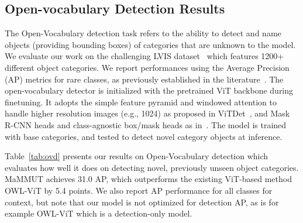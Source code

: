 \documentclass[10pt]{article} \usepackage[accepted]{tmlr}
\newcommand{\ours}{MaMMUT\xspace}
\begin{document}
\subsection{Open-vocabulary Detection Results}
\label{sec:detection}

The Open-Vocabulary detection task refers to the ability to detect and name objects (providing bounding boxes) of categories that are unknown to the model. We evaluate our work on the challenging LVIS dataset~\citep{lvis} which features 1200+ different object categories. We report performances using the Average Precision (AP) metrics for rare classes, as previously established in the literature~\citep{gu2022openvocabulary,minderer2022simple}. 
The open-vocabulary detector is initialized with the pretrained ViT backbone during finetuning. It adopts the simple feature pyramid and windowed attention to handle higher resolution images (e.g., 1024) as proposed in ViTDet~\citep{li2022exploring}, and Mask R-CNN heads and class-agnostic box/mask heads as in~\citep{du2022learning,gu2022openvocabulary,Zareian_2021_CVPR,zhong2021regionclip}. The model is trained with base categories, and tested to detect novel category objects at inference.

Table~\ref{tab:ovd} presents our results on Open-Vocabulary detection which evaluates how well it does on detecting novel, previously unseen object categories. \ours achieves 31.0 AP, which outperforms the existing ViT-based method OWL-ViT by 5.4 points. We also report AP performance for all classes for context, but note that our model is not optimized for detection AP, as is for example OWL-ViT which is a detection-only model.
\end{document}
